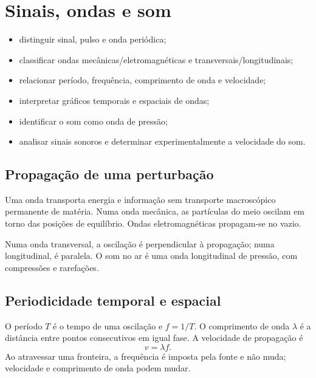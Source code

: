 \documentclass[11pt,a4paper,oneside]{book}
\begin{document}
\chapter{Sinais, ondas e som}
\begin{objetivos}
\begin{itemize}
  \item distinguir sinal, pulso e onda periódica;
  \item classificar ondas mecânicas/eletromagnéticas e transversais/longitudinais;
  \item relacionar período, frequência, comprimento de onda e velocidade;
  \item interpretar gráficos temporais e espaciais de ondas;
  \item identificar o som como onda de pressão;
  \item analisar sinais sonoros e determinar experimentalmente a velocidade do som.
\end{itemize}
\end{objetivos}

\section{Propagação de uma perturbação}
Uma onda transporta energia e informação sem transporte macroscópico permanente de matéria. Numa onda mecânica, as partículas do meio oscilam em torno das posições de equilíbrio. Ondas eletromagnéticas propagam-se no vazio.

Numa onda transversal, a oscilação é perpendicular à propagação; numa longitudinal, é paralela. O som no ar é uma onda longitudinal de pressão, com compressões e rarefações.

\section{Periodicidade temporal e espacial}
O período $T$ é o tempo de uma oscilação e $f=1/T$. O comprimento de onda $\lambda$ é a distância entre pontos consecutivos em igual fase. A velocidade de propagação é
\[
v=\lambda f.
\]
Ao atravessar uma fronteira, a frequência é imposta pela fonte e não muda; velocidade e comprimento de onda podem mudar.

\begin{center}
\end{center}
\end{document}
